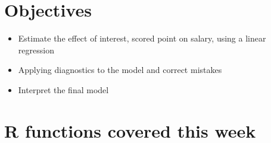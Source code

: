 \documentclass[
]{book}
\providecommand{\tightlist}{%
  \setlength{\itemsep}{0pt}\setlength{\parskip}{0pt}}
\begin{document}
\hypertarget{objectives-5}{%
\section{Objectives}\label{objectives-5}}

\begin{itemize}
\tightlist
\item
  Estimate the effect of interest, scored point on salary, using a linear regression
\item
  Applying diagnostics to the model and correct mistakes
\item
  Interpret the final model
\end{itemize}

\hypertarget{r-functions-covered-this-week-1}{%
\section{R functions covered this week}\label{r-functions-covered-this-week-1}}
\end{document}

